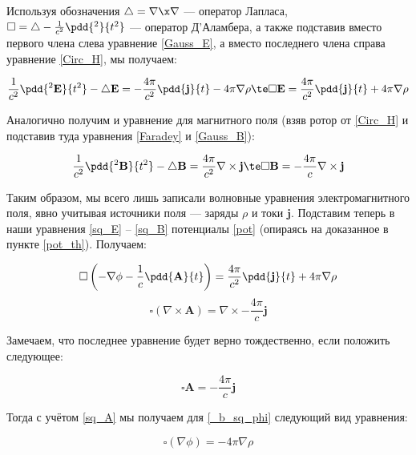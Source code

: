 \documentclass[12pt]{kiarticle}
\begin{document}
Используя обозначения $ \triangle = \nabla \x \nabla $  --- оператор Лапласа, $ \square = \triangle -  \frac{1}{c^2}\pdd{^2}{t^2}$ --- оператор Д'Аламбера, а также подставив вместо первого члена слева уравнение \eqref{Gauss_E}, а вместо последнего члена справа уравнение \eqref{Circ_H}, мы получаем:

\begin{equation}\label{sq_E}
\dfrac{1}{c^2}\pdd{^2\mathbf{E}}{t^2} - \triangle \mathbf{E} = - \dfrac{4\pi}{c^2} \pdd{\mathbf{j}}{t} - 4 \pi \nabla \rho \te \square \mathbf{E} = \dfrac{4\pi}{c^2} \pdd{\mathbf{j}}{t} + 4 \pi \nabla \rho
\end{equation}

Аналогично получим и уравнение для магнитного поля (взяв ротор от \eqref{Circ_H} и подставив туда уравнения \eqref{Faradey} и \eqref{Gauss_B}):

\begin{equation}\label{sq_B}
\dfrac{1}{c^2}\pdd{^2\mathbf{B}}{t^2} - \triangle \mathbf{B} = \dfrac{4\pi}{c^2} \nabla \times \mathbf{j} \te \square \mathbf{B} = - \dfrac{4\pi}{c} \nabla \times \mathbf{j}
\end{equation}

Таким образом, мы всего лишь записали волновные уравнения электромагнитного поля, явно учитывая источники поля --- заряды $ \rho $ и токи $ \mathbf{j} $. Подставим теперь в наши уравнения \eqref{sq_E} -- \eqref{sq_B} потенциалы \eqref{pot} (опираясь на доказанное в пункте \ref{pot_th}). Получаем:

\begin{equation}\label{_b_sq_phi}
\square \left( - \nabla \phi  - \dfrac{1}{c} \pdd{\mathbf{A}}{t} \right) = \dfrac{4\pi}{c^2} \pdd{\mathbf{j}}{t} + 4 \pi \nabla \rho
\end{equation}
\begin{equation}\label{}
\square \left( \nabla \times \mathbf{A} \right) = \nabla \times - \dfrac{4\pi}{c}\mathbf{j}
\end{equation}

Замечаем, что последнее уравнение будет верно тождественно, если положить следующее: 

\begin{equation}\label{sq_A}
\square \mathbf{A} = - \dfrac{4\pi}{c}\mathbf{j}
\end{equation}

Тогда с учётом \eqref{sq_A} мы получаем для \eqref{_b_sq_phi} следующий вид уравнения:

\begin{equation}\label{}
\square (\nabla \phi) = -4\pi \nabla \rho
\end{equation}
\end{document}
